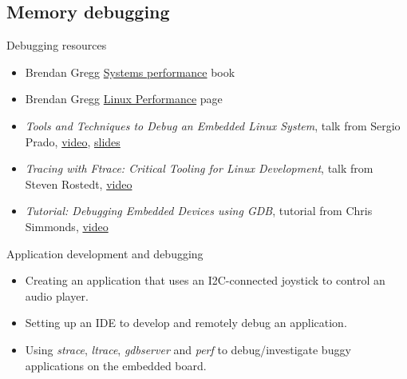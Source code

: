 \subsection{Memory debugging}



\begin{frame}{Debugging resources}
  \begin{itemize}
  \item Brendan Gregg
    \href{https://www.brendangregg.com/systems-performance-2nd-edition-book.html}{Systems
      performance} book
  \item Brendan Gregg
    \href{https://www.brendangregg.com/linuxperf.html}{Linux
      Performance} page
  \item {\em Tools and Techniques to Debug an Embedded Linux System},
    talk from Sergio Prado,
    \href{https://www.youtube.com/watch?v=dgPkZnGuIMg}{video},
    \href{https://elinux.org/images/c/cf/Slides-debugging.pdf}{slides}
  \item {\em Tracing with Ftrace: Critical Tooling for Linux
      Development}, talk from Steven Rostedt,
    \href{https://www.youtube.com/watch?v=mlxqpNvfvEQ}{video}
  \item {\em Tutorial: Debugging Embedded Devices using GDB}, tutorial
    from Chris Simmonds,
    \href{https://www.youtube.com/watch?v=JGhAgd2a_Ck}{video}
  \end{itemize}
\end{frame}

\setuplabframe
{Application development and debugging}
{
  \begin{itemize}
  \item Creating an application that uses an I2C-connected joystick to
    control an audio player.
  \item Setting up an IDE to develop and remotely debug an
    application.
  \item Using {\em strace}, {\em ltrace}, {\em gdbserver} and {\em
      perf} to debug/investigate buggy applications on the embedded
    board.
  \end{itemize}
}
